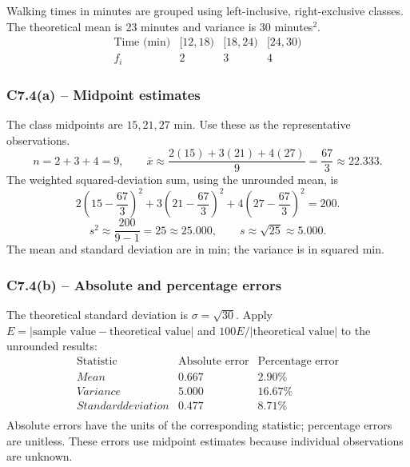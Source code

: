 {
Walking times in minutes are grouped using left-inclusive, right-exclusive classes.
The theoretical mean is 23 minutes and variance is 30 minutes$^2$.
\[
\begin{array}{c|rrr}
\text{Time (min)}&[12,18)&[18,24)&[24,30)\\\hline
f_i&2&3&4
\end{array}
\]
\label{sol:c7-4a}
\subsubsection*{C7.4(a) -- Midpoint estimates }
The class midpoints are $15,21,27$ min. Use these as the representative observations.
\[
n=2+3+4=9,\qquad
\bar{x}\approx\frac{2(15)+3(21)+4(27)}{9}=\frac{67}{3}\approx22.333.
\]
The weighted squared-deviation sum, using the unrounded mean, is
\[
2\left(15-\frac{67}{3}\right)^2+3\left(21-\frac{67}{3}\right)^2+4\left(27-\frac{67}{3}\right)^2=200.
\]
\[
s^2\approx\frac{200}{9-1}=25\approx25.000,\qquad
s\approx\sqrt{25}\approx5.000.
\]
The mean and standard deviation are in min; the variance is in squared min.

\label{sol:c7-4b}
\subsubsection*{C7.4(b) -- Absolute and percentage errors }
The theoretical standard deviation is $\sigma=\sqrt{30}$.
Apply $E=|\text{sample value}-\text{theoretical value}|$ and
$100E/|\text{theoretical value}|$ to the unrounded results:
\[
\begin{array}{l|rr}
\text{Statistic}&\text{Absolute error}&\text{Percentage error}\\\hline
Mean&0.667&2.90\%\\
Variance&5.000&16.67\%\\
Standard deviation&0.477&8.71\%\\
\end{array}
\]
Absolute errors have the units of the corresponding statistic; percentage errors are unitless.
These errors use midpoint estimates because individual observations are unknown.
\secInicio[sec:c7-4]


}
